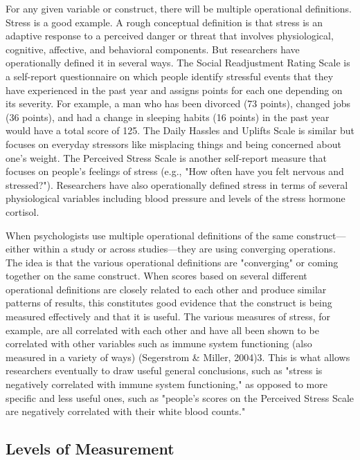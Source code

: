 For any given variable or construct, there will be multiple operational definitions. Stress is a good example. A rough conceptual definition is that stress is an adaptive response to a perceived danger or threat that involves physiological, cognitive, affective, and behavioral components. But researchers have operationally defined it in several ways. The Social Readjustment Rating Scale is a self-report questionnaire on which people identify stressful events that they have experienced in the past year and assigns points for each one depending on its severity. For example, a man who has been divorced (73 points), changed jobs (36 points), and had a change in sleeping habits (16 points) in the past year would have a total score of 125. The Daily Hassles and Uplifts Scale is similar but focuses on everyday stressors like misplacing things and being concerned about one's weight. The Perceived Stress Scale is another self-report measure that focuses on people's feelings of stress (e.g., "How often have you felt nervous and stressed?"). Researchers have also operationally defined stress in terms of several physiological variables including blood pressure and levels of the stress hormone cortisol.

When psychologists use multiple operational definitions of the same construct—either within a study or across studies—they are using converging operations. The idea is that the various operational definitions are "converging" or coming together on the same construct. When scores based on several different operational
definitions are closely related to each other and produce similar patterns of results, this constitutes good evidence that the construct is being measured effectively and that it is useful. The various measures of stress, for example, are all correlated with each other and have all been shown to be correlated with other variables such as immune system functioning (also measured in a variety of ways) (Segerstrom \& Miller, 2004)3. This is what allows researchers eventually to draw useful general conclusions, such as "stress is negatively correlated with immune system functioning," as opposed to more specific and less useful ones, such as "people's scores on the Perceived Stress Scale are negatively correlated with their white blood counts."

\subsection{Levels of Measurement}

